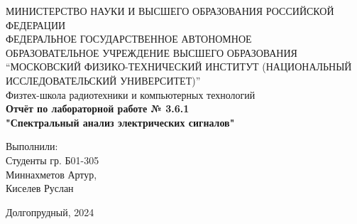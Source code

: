 \begin{center}
МИНИСТЕРСТВО НАУКИ И ВЫСШЕГО ОБРАЗОВАНИЯ РОССИЙСКОЙ ФЕДЕРАЦИИ\\
\hfill \break
ФЕДЕРАЛЬНОЕ ГОСУДАРСТВЕННОЕ АВТОНОМНОЕ \\ ОБРАЗОВАТЕЛЬНОЕ УЧРЕЖДЕНИЕ ВЫСШЕГО ОБРАЗОВАНИЯ \\
“МОСКОВСКИЙ ФИЗИКО-ТЕХНИЧЕСКИЙ ИНСТИТУТ (НАЦИОНАЛЬНЫЙ ИССЛЕДОВАТЕЛЬСКИЙ УНИВЕРСИТЕТ)” \\

\hfill \break
Физтех-школа радиотехники и компьютерных технологий\\
\vspace{2.5cm}
\large{\textbf{Отчёт по лабораторной работе № 3.6.1}}\\
\large{\textbf{"Спектральный анализ электрических сигналов"}}\\
\hfill \break
\end{center}

\vspace{5cm}

\begin{flushright}
Выполнили:\\
Студенты гр. Б01-305\\
Миннахметов Артур,\\
Киселев Руслан
\end{flushright}

\vfill


\begin{center} Долгопрудный, 2024 \end{center}

\thispagestyle{empty}
\newpage
